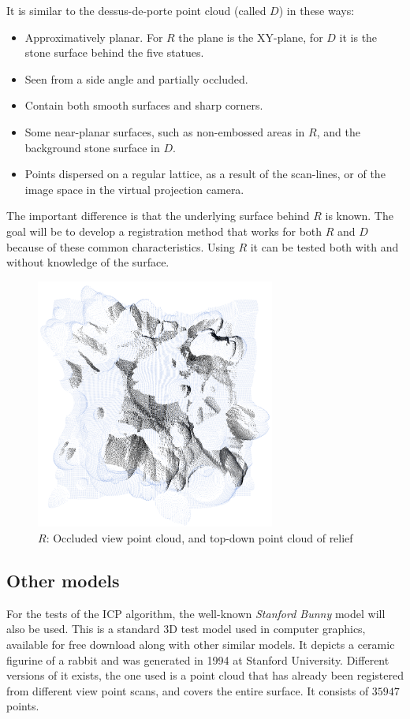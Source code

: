 It is similar to the dessus-de-porte point cloud (called $D$) in these ways:
\begin{itemize}
\item Approximatively planar. For $R$ the plane is the XY-plane, for $D$ it is the stone surface behind the five statues.
\item Seen from a side angle and partially occluded.
\item Contain both smooth surfaces and sharp corners.
\item Some near-planar surfaces, such as non-embossed areas in $R$, and the background stone surface in $D$.
\item Points dispersed on a regular lattice, as a result of the scan-lines, or of the image space in the virtual projection camera.
\end{itemize}

The important difference is that the underlying surface behind $R$ is known. The goal will be to develop a registration method that works for both $R$ and $D$ because of these common characteristics. Using $R$ it can be tested both with and without knowledge of the surface.

\begin{figure}[h]
\centering
\includegraphics[width=0.7\textwidth]{fig/r1_crop.png}
\caption{$R$: Occluded view point cloud, and top-down point cloud of relief}
\label{fig:relief_crop}
\end{figure}


\subsection{Other models}
For the tests of the ICP algorithm, the well-known \emph{Stanford Bunny} model will also be used. This is a standard 3D test model used in computer graphics, available for free download along with other similar models. It depicts a ceramic figurine of a rabbit and was generated in 1994 at Stanford University. Different versions of it exists, the one used is a point cloud that has already been registered from different view point scans, and covers the entire surface. It consists of $35947$ points.

